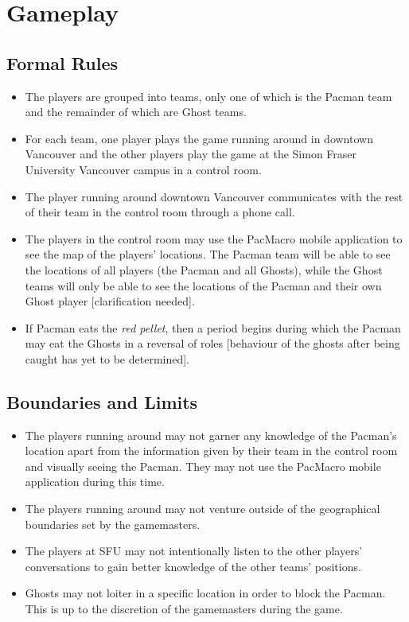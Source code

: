 \documentclass[10pt, oneside, letterpaper, titlepage]{article}
\begin{document}
	\section{Gameplay}
	\label{sec:gameplay}

	\subsection{Formal Rules}
	\label{subsec:gameplay:formal-rules}

	\begin{itemize}
		\item The players are grouped into teams, only one of which is the Pacman team and the remainder of which are Ghost teams.
		\item For each team, one player plays the game running around in downtown Vancouver and the other players play the game at the Simon Fraser University Vancouver campus in a control room.
		\item The player running around downtown Vancouver communicates with the rest of their team in the control room through a phone call.
		\item The players in the control room may use the PacMacro mobile application to see the map of the players' locations. The Pacman team will be able to see the locations of all players (the Pacman and all Ghosts), while the Ghost teams will only be able to see the locations of the Pacman and their own Ghost player [clarification needed].
		\item If Pacman eats the \emph{red pellet}, then a period begins during which the Pacman may eat the Ghosts in a reversal of roles [behaviour of the ghosts after being caught has yet to be determined].
	\end{itemize}

	\subsection{Boundaries and Limits}
	\label{subsec:gameplay:boundaries-and-limits}

	\begin{itemize}
		\item The players running around may not garner any knowledge of the Pacman's location apart from the information given by their team in the control room and visually seeing the Pacman. They may not use the PacMacro mobile application during this time.
		\item The players running around may not venture outside of the geographical boundaries set by the gamemasters.
		\item The players at SFU may not intentionally listen to the other players' conversations to gain better knowledge of the other teams' positions.
		\item Ghosts may not loiter in a specific location in order to block the Pacman. This is up to the discretion of the gamemasters during the game.
	\end{itemize}
\end{document}
